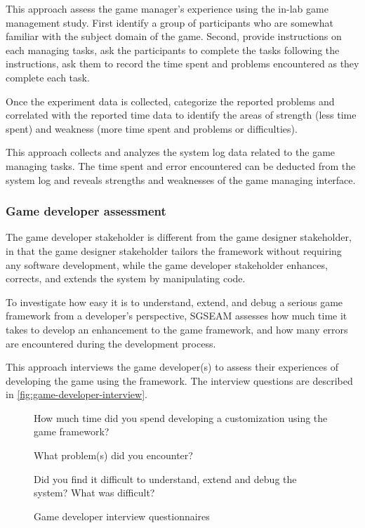\label{In-lab game management study}

This approach assess the game manager's experience using the in-lab game management study.  First identify a group 
of participants who are somewhat familiar with the subject domain of the game. Second, provide instructions on 
each managing tasks, ask the participants to complete the tasks following the instructions, ask them to record 
the time spent and problems encountered as they complete each task.

Once the experiment data is collected, categorize the reported problems and correlated with the reported time data 
to identify the areas of strength (less time spent) and weakness (more time spent and problems or difficulties). 

\label{Game management log data analysis}

This approach collects and analyzes the system log data related to the game managing tasks. The time spent and error encountered can be deducted from the system log and reveals strengths and weaknesses of the game managing interface.

\subsubsection{Game developer assessment}

The game developer stakeholder is different from the game designer stakeholder, in that the
game designer stakeholder tailors the framework without requiring any software
development, while the game developer stakeholder enhances, corrects, and extends the system by
manipulating code. 

To investigate how easy it is to understand, extend, and debug a serious game framework from a developer's 
perspective, SGSEAM assesses how much time it takes to develop an
enhancement to the game framework, and how many errors are encountered
during the development process.

\label{Post-hoc game developer interview}

This approach interviews the game developer(s) to assess their experiences of developing the game 
using the framework. The interview questions are described in \autoref{fig:game-developer-interview}.  
 
\begin{figure}[ht!]
\begin{mybox}
\begin{compactenum}
\item How much time did you spend developing a customization using the game framework?
\item What problem(s) did you encounter?
\item Did you find it difficult to understand, extend and debug the system? What was difficult?
\end{compactenum}
\end{mybox}
\caption{Game developer interview questionnaires}
\label{fig:game-developer-interview}  
\end{figure}

